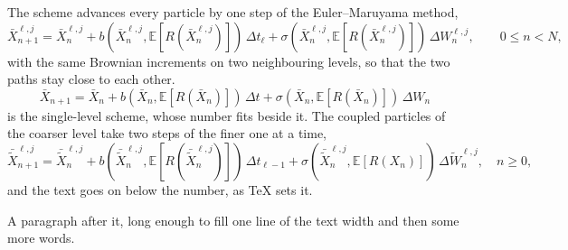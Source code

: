 \documentclass{article}
\begin{document}
The scheme advances every particle by one step of the Euler--Maruyama method,
\begin{equation}
  \bar X_{n+1}^{\ell,j} = \bar X_n^{\ell,j} + b(\bar X_n^{\ell,j}, \mathbb E[R(\bar X_n^{\ell,j})])\,\Delta t_{\ell} + \sigma(\bar X_n^{\ell,j}, \mathbb E[R(\bar X_n^{\ell,j})])\,\Delta W_n^{\ell,j}, \qquad 0\le n<N,
\end{equation}
with the same Brownian increments on two neighbouring levels, so that the two paths stay close to each other.
\begin{equation}
  \bar X_{n+1} = \bar X_n + b(\bar X_n, \mathbb E[R(\bar X_n)])\,\Delta t + \sigma(\bar X_n, \mathbb E[R(\bar X_n)])\,\Delta W_n
\end{equation}
is the single-level scheme, whose number fits beside it. The coupled particles of the coarser level take two steps of the finer one at a time,
\begin{equation}
  \bar{\widetilde X}_{n+1}^{\ell,j} = \bar{\widetilde X}_n^{\ell,j} + b(\bar{\widetilde X}_n^{\ell,j}, \mathbb E[R(\bar{\widetilde X}_n^{\ell,j})])\,\Delta t_{\ell-1} + \sigma(\bar{\widetilde X}_n^{\ell,j}, \mathbb E[R(X_n)])\,\Delta \widetilde W_n^{\ell,j}, \quad n\ge0,
\end{equation}
and the text goes on below the number, as TeX sets it.

A paragraph after it, long enough to fill one line of the text width and then some more words.
\end{document}
